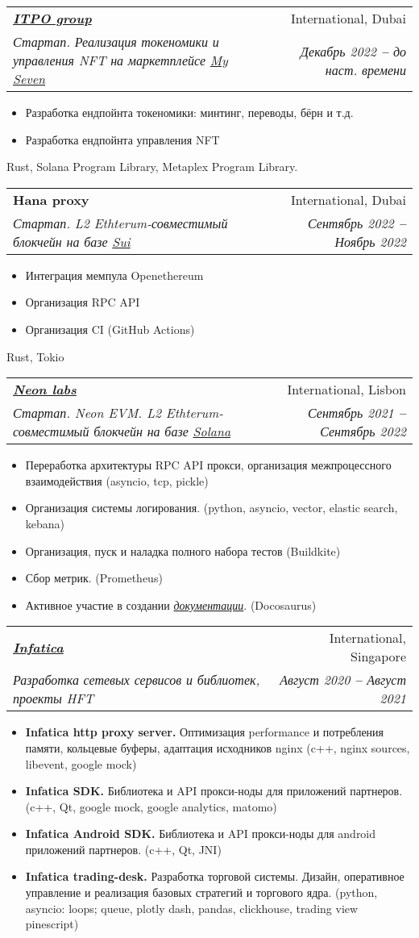 \documentclass[letterpaper,11pt]{article}
\makeatletter
\newcommand{\resumeItem}[1]{
  \item\small{
    {#1 \vspace{-2pt}}
  }
}
\newcommand{\resumeSubheading}[4]{
  \vspace{-2pt}\item
    \begin{tabular*}{0.97\textwidth}[t]{l@{\extracolsep{\fill}}r}
      \textbf{#1} & #2 \\
      \textit{\small#3} & \textit{\small #4} \\
    \end{tabular*}\vspace{-7pt}
}
\newcommand{\resumeItemListStart}{\begin{itemize}}
\newcommand{\resumeItemListEnd}{\end{itemize}\vspace{-5pt}}
\makeatother
\begin{document}
    \resumeSubheading
        {\emph{\href{http://itpo.group/}{\color{blue}ITPO group}}}{International, Dubai}
        {Стартап. Реализация токеномики и управления NFT на маркетплейсе \emph{\href{https://www.myseven.io/}{\color{blue}My Seven}}}{Декабрь 2022 \textbf{--} до наст. времени}
        \resumeItemListStart
            \resumeItem{Разработка ендпойнта токеномики: минтинг, переводы, бёрн и т.д.}
            \resumeItem{Разработка ендпойнта управления NFT}
        \resumeItemListEnd
        Rust, Solana Program Library, Metaplex Program Library.

    \resumeSubheading
      {Hana proxy}{International, Dubai}
      {Стартап. L2 Ethterum-совместимый блокчейн на базе \emph{\href{https://sui.io}{\color{blue}Sui}}}{Сентябрь 2022 \textbf{--} Ноябрь 2022}
        \resumeItemListStart
            \resumeItem{Интеграция мемпула Openethereum }
            \resumeItem{Организация RPC API}
            \resumeItem{Организация CI (GitHub Actions)}
        \resumeItemListEnd
      Rust, Tokio    

    \resumeSubheading
      {\emph{\href{http://neonlabs.org/}{\color{blue}Neon labs}}}{International, Lisbon}
      {Стартап. Neon EVM. L2 Ethterum-совместимый блокчейн на базе \emph{\href{https://solana.com}{\color{blue}Solana}}}{Сентябрь 2021 \textbf{--} Сентябрь 2022}
        \resumeItemListStart
            \resumeItem{ Переработка архитектуры RPC API прокси, организация межпроцессного взаимодействия (asyncio, tcp, pickle) }
            \resumeItem{ Организация системы логирования. (python, asyncio, vector, elastic search, kebana) }
            \resumeItem{ Организация, пуск и наладка полного набора тестов (Buildkite)}
            \resumeItem{ Сбор метрик. (Prometheus)}
            \resumeItem{ Активное участие в создании \emph{\href{https://docs.neonlabs.org}{\color{blue}документации}}. (Docosaurus)}
        \resumeItemListEnd

    \resumeSubheading
      {\emph{\href{http://https://infatica.io/}{\color{blue}Infatica}}}{International, Singapore}
      {Разработка сетевых сервисов и библиотек, проекты HFT }{Август 2020 \textbf{--} Август 2021}
        \resumeItemListStart
            \resumeItem{ \textbf{Infatica http proxy server.} Оптимизация performance и потребления памяти, кольцевые буферы, адаптация исходников nginx (c++, nginx sources, libevent, google mock) }
            \resumeItem{ \textbf{Infatica SDK. } Библиотека и API прокси-ноды для приложений партнеров. (c++, Qt, google mock, google analytics, matomo) }
            \resumeItem{ \textbf{Infatica Android SDK. } Библиотека и API прокси-ноды для android приложений партнеров. (c++, Qt, JNI)}
            \resumeItem{ \textbf{Infatica trading-desk. } Разработка торговой системы. Дизайн, оперативное управление и реализация базовых стратегий и торгового ядра. (python, asyncio: loops; queue, plotly dash, pandas, clickhouse, trading view pinescript) }
        \resumeItemListEnd
\end{document}
